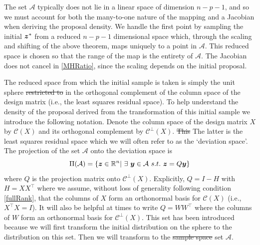 \documentclass[11pt]{article}
\newcommand{\by}{\mbox{\boldmath $y$}}
\newcommand{\bz}{\mbox{\boldmath $z$}}
\newcommand{\mc}{\mathcal}
\newcommand{\green}[1]{{\color{green}#1}}
\begin{document}

The set $\mathcal{A}$ typically does not lie in a linear space of dimension $n - p - 1$, and 
so we must account for both the many-to-one nature of the mapping and
a Jacobian when deriving the proposal density.  We handle the first
point by sampling the initial $\bz^*$ from
 a reduced $n - p - 1$ dimensional space which, through the scaling and
shifting of the above theorem, maps uniquely to a point 
in $\mathcal{A}$. This reduced space is chosen so that the range of the map is the
entirety of $\mathcal{A}$.  The Jacobian does not cancel in
\eqref{MHRatio}, since the scaling depends on the initial proposal. 

The reduced space from which the initial sample is taken is simply the
unit sphere \green{\sout{restricted to} in} the orthogonal complement of the column space of the design matrix (i.e., the least squares residual space). To help understand the density of the proposal derived from the transformation of this initial sample we introduce the following notation. Denote the column space of the design matrix $X$ by $\mathcal{C}(X)$ and its orthogonal complement by $\mc{C}^\perp(X)$. 
\green{\sout{This} The latter} is the least squares residual space which we will often refer to as the `deviation space'.  The projection of the set $\mathcal{A}$ onto the deviation space is 
\begin{equation}
\label{sampleSpacePerp}
\Pi(\mathcal{A})=\{\bz\in \mathbb{R}^n |\ \exists\ \by\in \mathcal{A}\
s.t.\ \bz=Q \by \}
\end{equation} 
where $Q$ is the projection matrix onto  $\mc{C}^\perp(X)$. Explicitly, $Q=I-H$ with $H=XX^\top$ where we assume, without
loss of generality following condition \ref{fullRank},  that the
columns of $X$ form an orthonormal basis for $\mc{C}(X)$
(i.e., $X^\top X=I$). It will also be helpful at times to write $Q=WW^{\top}$ where the columns of $W$ form an orthonormal basis for $\mc{C}^\perp(X)$. This set has been introduced because we will first transform the initial distribution on the sphere to the distribution on this set. Then we will transform to the \green{\sout{sample space} set} $\mc A$.
\end{document}
